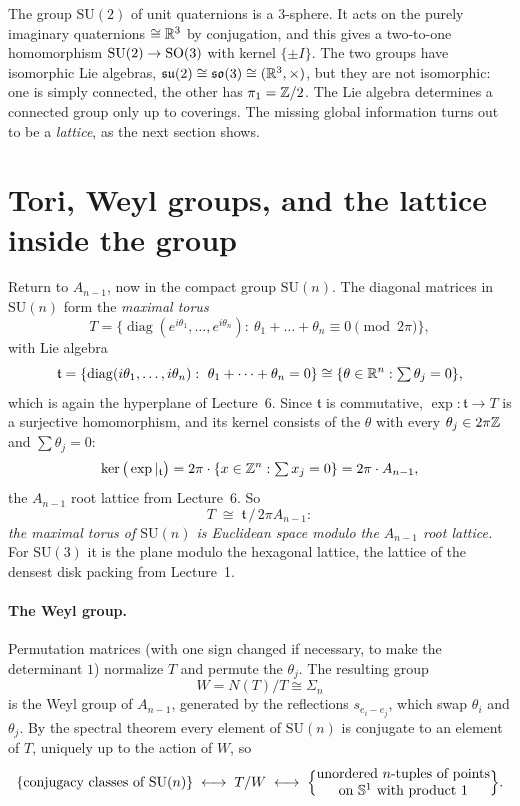 \begin{remark}
The group $\mathrm{SU}(2)$ of unit quaternions is a $3$-sphere. It acts on the purely imaginary
quaternions $\cong\mathbb{R}^3$ by conjugation, and this gives a two-to-one homomorphism
$\mathrm{SU}(2)\to\mathrm{SO}(3)$ with kernel $\{\pm I\}$. The two groups have isomorphic Lie algebras,
$\mathfrak{su}(2)\cong\mathfrak{so}(3)\cong(\mathbb{R}^3,\times)$, but they are not isomorphic: one is simply connected,
the other has $\pi_1=\mathbb{Z}/2$. The Lie algebra determines a connected group only up to coverings. The
missing global information turns out to be a \emph{lattice}, as the next section shows.
\end{remark}

\section{Tori, Weyl groups, and the lattice inside the group}
\label{LIE:sec:torus}

Return to $A_{n-1}$, now in the compact group $\mathrm{SU}(n)$. The diagonal matrices in $\mathrm{SU}(n)$ form
the \emph{maximal torus}
\[
  T=\big\{\operatorname{diag}(e^{i\theta_1},\dots,e^{i\theta_n}):\ \theta_1+\dots+\theta_n\equiv0\pmod{2\pi}\big\},
\]
with Lie algebra
\[
  \mathfrak t=\{\operatorname{diag}(i\theta_1,\dots,i\theta_n):\ \theta_1+\dots+\theta_n=0\}
  \cong\{\theta\in\R^n:\textstyle\sum\theta_j=0\},
\]
which is again the hyperplane of Lecture~6. Since $\mathfrak t$ is commutative, $\exp\colon\mathfrak t\to T$ is a
surjective homomorphism, and its kernel consists of the $\theta$ with every $\theta_j\in2\pi\mathbb{Z}$ and
$\sum\theta_j=0$:
\[
  \ker\big(\exp|_{\mathfrak t}\big)=2\pi\cdot\{x\in\mathbb{Z}^n:\textstyle\sum x_j=0\}=2\pi\cdot A_{n-1},
\]
the $A_{n-1}$ root lattice from Lecture~6. So
\[
  T\;\cong\;\mathfrak t\,/\,2\pi A_{n-1}:
\]
\emph{the maximal torus of $\mathrm{SU}(n)$ is Euclidean space modulo the $A_{n-1}$ root lattice.} For
$\mathrm{SU}(3)$ it is the plane modulo the hexagonal lattice, the lattice of the densest disk packing
from Lecture~1.

\paragraph{The Weyl group.} Permutation matrices (with one sign changed if necessary, to make the
determinant $1$) normalize $T$ and permute the $\theta_j$. The resulting group
\[
  W=N(T)/T\cong\Sigma_n
\]
is the Weyl group of $A_{n-1}$, generated by the reflections $s_{e_i-e_j}$, which swap $\theta_i$ and
$\theta_j$. By the spectral theorem every element of $\mathrm{SU}(n)$ is conjugate to an element of $T$,
uniquely up to the action of $W$, so
\[
  \{\text{conjugacy classes of }\mathrm{SU}(n)\}\;\longleftrightarrow\;T/W
  \;\longleftrightarrow\;\Big\{\begin{array}{@{}c@{}}\text{unordered $n$-tuples of points}\\
  \text{on }\Sph^1\text{ with product }1\end{array}\Big\}.
\]

